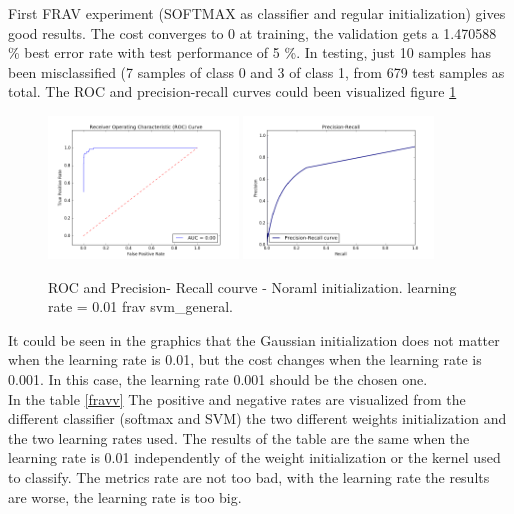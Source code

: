First FRAV experiment (SOFTMAX as classifier and regular initialization) gives good results. The cost converges to 0 at training, the validation gets a 1.470588 \% best error rate with test performance of 5 \%. In testing, just 10 samples has been misclassified (7 samples of class 0 and 3 of class 1, from 679 test samples as total. The ROC  and precision-recall curves could been visualized figure \ref{fig:Imagenet2-frav-frav1ROC}\\

\begin{figure}[htb]
\centering
\includegraphics[width=0.45\textwidth]{images/FRAv_casia_ImageNet/Imagenet2/frav/frav1/ROC.png}
\includegraphics[width=0.45\textwidth]{images/FRAv_casia_ImageNet/Imagenet2/frav/svm_general/Precision-Recall.png}
\caption{ROC and Precision- Recall courve - Noraml initialization. learning rate = 0.01 frav svm\_general.} \label{fig:Imagenet2-frav-frav1ROC}
\end{figure}

It could be seen in the graphics that the Gaussian initialization does not matter when the learning rate is 0.01, but the cost changes when the learning rate is 0.001. In this case, the learning rate 0.001 should be the chosen one.\\

In the table \ref{fravv} The positive and negative rates are visualized from the different classifier (softmax and SVM) the two different weights initialization and the two learning rates used. The results of the table are the same when the learning rate is 0.01 independently of the weight initialization or the kernel used to classify. The metrics rate are not too bad, with the learning rate the results are worse, the learning rate is too big.\\


